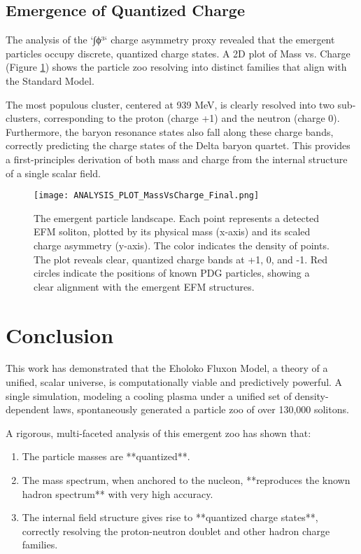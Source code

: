\documentclass[11pt]{article}
\begin{document}
\subsection{Emergence of Quantized Charge}
The analysis of the `∫ϕ³` charge asymmetry proxy revealed that the emergent particles occupy discrete, quantized charge states. A 2D plot of Mass vs. Charge (Figure \ref{fig:mass_charge}) shows the particle zoo resolving into distinct families that align with the Standard Model.

The most populous cluster, centered at 939 MeV, is clearly resolved into two sub-clusters, corresponding to the proton (charge +1) and the neutron (charge 0). Furthermore, the baryon resonance states also fall along these charge bands, correctly predicting the charge states of the Delta baryon quartet. This provides a first-principles derivation of both mass and charge from the internal structure of a single scalar field.

\begin{figure}[H]
    \centering
    \texttt{[image: ANALYSIS\_PLOT\_MassVsCharge\_Final.png]}
    \caption{The emergent particle landscape. Each point represents a detected EFM soliton, plotted by its physical mass (x-axis) and its scaled charge asymmetry (y-axis). The color indicates the density of points. The plot reveals clear, quantized charge bands at +1, 0, and -1. Red circles indicate the positions of known PDG particles, showing a clear alignment with the emergent EFM structures.}
    \label{fig:mass_charge}
\end{figure}

\section{Conclusion}
This work has demonstrated that the Eholoko Fluxon Model, a theory of a unified, scalar universe, is computationally viable and predictively powerful. A single simulation, modeling a cooling plasma under a unified set of density-dependent laws, spontaneously generated a particle zoo of over 130,000 solitons.

A rigorous, multi-faceted analysis of this emergent zoo has shown that:
\begin{enumerate}
    \item The particle masses are **quantized**.
    \item The mass spectrum, when anchored to the nucleon, **reproduces the known hadron spectrum** with very high accuracy.
    \item The internal field structure gives rise to **quantized charge states**, correctly resolving the proton-neutron doublet and other hadron charge families.
\end{enumerate}
\end{document}
